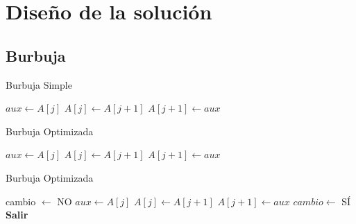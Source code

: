 \documentclass[12pt, fleqn]{report}                             %
\theoremstyle{break}                                            %
\begin{document}
	

    \clearpage

	\section{Diseño de la solución}
		\subsection{Burbuja}
        	\begin{algorithm}[H]
            \caption{Burbuja Simple}
            \begin{algorithmic}[1]
                            \State $aux \gets A[j]$
                            \State $A[j] \gets A[j+1]$
                            \State $A[j+1] \gets aux$
                        \EndIf
                    \EndFor
                \EndFor
                \EndProcedure
                \end{algorithmic}
            \end{algorithm}
            
            \begin{algorithm}[H]
            \caption{Burbuja Optimizada}
            \begin{algorithmic}[1]
                            \State $aux \gets A[j]$
                            \State $A[j] \gets A[j+1]$
                            \State $A[j+1] \gets aux$
                        \EndIf
                    \EndFor
                \EndFor
                \EndProcedure
                \end{algorithmic}
            \end{algorithm}
            
            \begin{algorithm}[H]
            \caption{Burbuja Optimizada}
            \begin{algorithmic}[1]
                    \State cambio $\gets$ NO
                            \State $aux \gets A[j]$
                            \State $A[j] \gets A[j+1]$
                            \State $A[j+1] \gets aux$
                            \State $cambio \gets$ SÍ
                        \EndIf
                    \EndFor
                        \State \textbf{Salir}
                    \EndIf
                \EndFor
                \EndProcedure
                \end{algorithmic}
            \end{algorithm}
            
\end{document}
